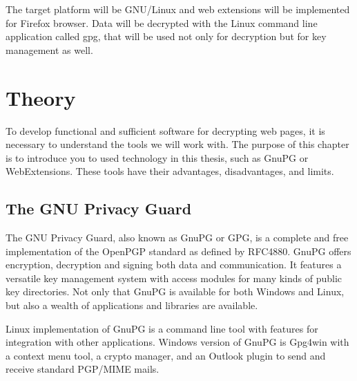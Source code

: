 The target platform will be GNU/Linux and web extensions will be implemented for Firefox browser. Data will be decrypted with the Linux command line application called gpg, that will be used not only for decryption but for key management as well.

\chapter{Theory}
To develop functional and sufficient software for decrypting web pages, it is necessary to understand the tools we will work with. The purpose of this chapter is to introduce you to used technology in this thesis, such as GnuPG or WebExtensions. These tools have their advantages, disadvantages, and limits.

\section{The GNU Privacy Guard}
The GNU Privacy Guard, also known as GnuPG or GPG, is a complete and free implementation of the OpenPGP standard as defined by RFC4880. GnuPG offers encryption, decryption and signing both data and communication. It features a versatile key management system with access modules for many kinds of public key directories. Not only that GnuPG is available for both Windows and Linux, but also a wealth of applications and libraries are available.

Linux implementation of GnuPG is a command line tool with features for integration with other applications. Windows version of GnuPG is Gpg4win with a context menu tool, a crypto manager, and an Outlook plugin to send and receive standard PGP/MIME mails.

